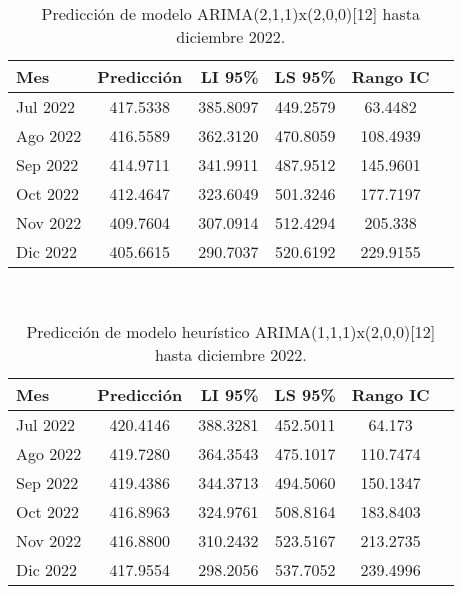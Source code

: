 \documentclass{report}
\begin{document}
\begin{table}[h!]
  \begin{center}
    \label{tab:table1}
    \begin{tabular}{|l|c|r|c|c|c} 
    \hline
      \textbf{Mes} & \textbf{Predicción} & \textbf{LI 95\%} & \textbf{LS 95\%} & \textbf{Rango IC}\\
      \hline
      Jul 2022 & 417.5338 & 385.8097 & 449.2579 & 63.4482\\
      \hline
      Ago 2022 & 416.5589 & 362.3120 & 470.8059 & 108.4939\\
      \hline
      Sep 2022 & 414.9711 & 341.9911 & 487.9512 & 145.9601\\
      \hline
      Oct 2022 & 412.4647 & 323.6049 & 501.3246 & 177.7197\\
      \hline
      Nov 2022 & 409.7604 & 307.0914 & 512.4294 & 205.338\\
      \hline
      Dic 2022 & 405.6615 & 290.7037 & 520.6192 & 229.9155\\
      \hline
    \end{tabular}
  \end{center}
  \caption{Predicción de modelo ARIMA(2,1,1)x(2,0,0)[12] hasta diciembre 2022.}
\end{table}\\

\begin{table}[h!]
  \begin{center}
    \label{tab:table1}
    \begin{tabular}{|l|c|r|c|c|c} 
    \hline
      \textbf{Mes} & \textbf{Predicción} & \textbf{LI 95\%} & \textbf{LS 95\%} & \textbf{Rango IC}\\
      \hline
      Jul 2022 & 420.4146 & 388.3281 & 452.5011 & 64.173\\
      \hline
      Ago 2022 & 419.7280 & 364.3543 & 475.1017 & 110.7474\\
      \hline
      Sep 2022 & 419.4386 & 344.3713 & 494.5060 & 150.1347\\
      \hline
      Oct 2022 & 416.8963 & 324.9761 & 508.8164 & 183.8403\\
      \hline
      Nov 2022 & 416.8800 & 310.2432 & 523.5167 & 213.2735\\
      \hline
      Dic 2022 & 417.9554 & 298.2056 & 537.7052 & 239.4996\\
      \hline
    \end{tabular}
  \end{center}
  \caption{Predicción de modelo heurístico ARIMA(1,1,1)x(2,0,0)[12] hasta diciembre 2022.}
\end{table}\\
\vspace{4cm}
\end{document}
